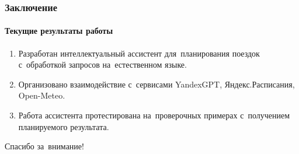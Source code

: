 \documentclass{beamer}
\begin{document}
\begin{frame}
  \frametitle{Заключение}
  \framesubtitle{Текущие результаты работы}

  \begin{enumerate}
  \item {
Разработан интеллектуальный ассистент для~планирования поездок с~обработкой запросов на~естественном языке. 
  }
  \item {
Организовано взаимодействие с~сервисами YandexGPT, Яндекс.Расписания, Open-Meteo.
  }
  \item {
Работа ассистента протестирована на~проверочных примерах с~получением планируемого результата.
    }
    \end{enumerate}
\end{frame}

\begin{frame}
  \begin{center}
{\Large Спасибо за~внимание!}
    \end{center}
  \end{frame}
\end{document}
